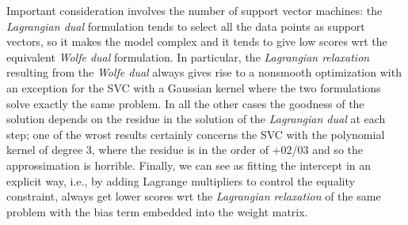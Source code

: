 Important consideration involves the number of support vector machines: the \emph{Lagrangian dual} formulation tends to select all the data points as support vectors, so it makes the model complex and it tends to give low scores wrt the equivalent \emph{Wolfe dual} formulation. In particular, the \emph{Lagrangian relaxation} resulting from the \emph{Wolfe dual} always gives rise to a nonsmooth optimization with an exception for the SVC with a Gaussian kernel where the two formulations solve exactly the same problem. In all the other cases the goodness of the solution depends on the residue in the solution of the \emph{Lagrangian dual} at each step; one of the wrost results certainly concerns the SVC with the polynomial kernel of degree 3, where the residue is in the order of +02/03 and so the approssimation is horrible. Finally, we can see as fitting the intercept in an explicit way, i.e., by adding Lagrange multipliers to control the equality constraint, always get lower scores wrt the \emph{Lagrangian relaxation} of the same problem with the bias term embedded into the weight matrix.